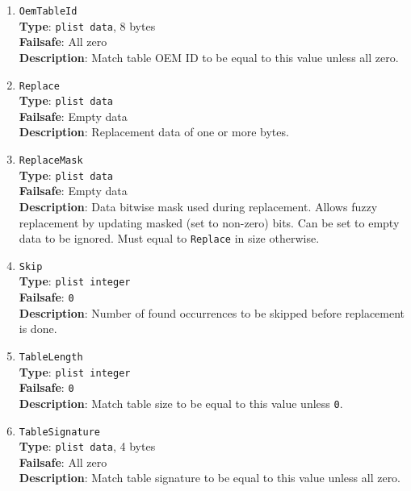 \documentclass[]{article}
\begin{document}
\begin{enumerate}
\item
  \texttt{OemTableId}\\
  \textbf{Type}: \texttt{plist\ data}, 8 bytes\\
  \textbf{Failsafe}: All zero\\
  \textbf{Description}: Match table OEM ID to be equal to this value
  unless all zero.

\item
  \texttt{Replace}\\
  \textbf{Type}: \texttt{plist\ data}\\
  \textbf{Failsafe}: Empty data\\
  \textbf{Description}: Replacement data of one or more bytes.

\item
  \texttt{ReplaceMask}\\
  \textbf{Type}: \texttt{plist\ data}\\
  \textbf{Failsafe}: Empty data\\
  \textbf{Description}: Data bitwise mask used during replacement.
  Allows fuzzy replacement by updating masked (set to non-zero) bits. Can be
  set to empty data to be ignored. Must equal to \texttt{Replace} in size
  otherwise.

\item
  \texttt{Skip}\\
  \textbf{Type}: \texttt{plist\ integer}\\
  \textbf{Failsafe}: \texttt{0}\\
  \textbf{Description}: Number of found occurrences to be skipped before replacement
  is done.

\item
  \texttt{TableLength}\\
  \textbf{Type}: \texttt{plist\ integer}\\
  \textbf{Failsafe}: \texttt{0}\\
  \textbf{Description}: Match table size to be equal to this value
  unless \texttt{0}.

\item
  \texttt{TableSignature}\\
  \textbf{Type}: \texttt{plist\ data}, 4 bytes\\
  \textbf{Failsafe}: All zero\\
  \textbf{Description}: Match table signature to be equal to this value
  unless all zero.

\end{enumerate}
\end{document}
